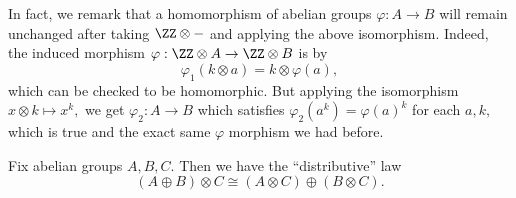 \documentclass[../notes.tex]{subfiles}
\begin{document}
\begin{remark}[Nir] \label{rem:ringtensoristrivial}
	In fact, we remark that a homomorphism of abelian groups $\varphi:A\to B$ will remain unchanged after taking $\ZZ\otimes-$ and applying the above isomorphism. Indeed, the induced morphism $\varphi:\ZZ\otimes A\to\ZZ\otimes B$ is by
	\[\varphi_1(k\otimes a)=k\otimes\varphi(a),\]
	which can be checked to be homomorphic. But applying the isomorphism $x\otimes k\mapsto x^k,$ we get $\varphi_2:A\to B$ which satisfies $\varphi_2\left(a^k\right)=\varphi(a)^k$ for each $a,k,$ which is true and the exact same $\varphi$ morphism we had before.
\end{remark}
\begin{proposition} \label{prop:tensordist}
	Fix abelian groups $A,B,C.$ Then we have the ``distributive'' law
	\[(A\oplus B)\otimes C\cong(A\otimes C)\oplus(B\otimes C).\]
\end{proposition}
\end{document}
